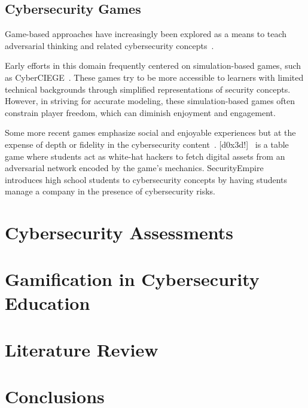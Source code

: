 \documentclass{uofithesis}
\begin{document}
\subsection{Cybersecurity Games}
Game-based approaches have increasingly been explored as a means to teach adversarial thinking and related cybersecurity concepts~\cite{lee2020game}.

Early efforts in this domain frequently centered on simulation-based games, such as CyberCIEGE~\cite{cyberciege}. These games try to be more accessible to learners with limited technical backgrounds through simplified representations of security concepts. However, in striving for accurate modeling, these simulation-based games often constrain player freedom, which can diminish enjoyment and engagement.


Some more recent games emphasize social and enjoyable experiences but at the expense of depth or fidelity in the cybersecurity content~\cite{d0x3d, de2006using, MeetingMayhem}. [d0x3d!]~\cite{d0x3d} is a table game where students act as white-hat hackers to fetch digital assets from an adversarial network encoded by the game's mechanics.
SecurityEmpire~\cite{olano2014securityempire} introduces high school students to cybersecurity concepts
by having students manage a company in the presence of cybersecurity risks.


\section{Cybersecurity Assessments}

\section{Gamification in Cybersecurity Education}

\section{Literature Review}

\section{Conclusions}

\printbibliography[heading=bibintoc,title={References}]
\end{document}
